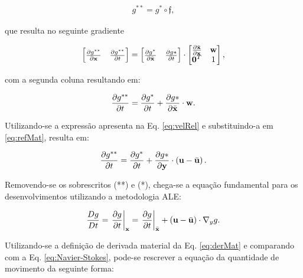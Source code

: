 \documentclass[tese_patricia]{subfiles}%
\begin{document}
\begin{align}
	g^{**} = g^{*}  \circ \mathfrak{f},
\end{align}

\noindent que resulta no seguinte gradiente

\begin{align}
	\begin{bmatrix}
		\frac{\partial {g^{**}}}{\partial {\mathbf{x}}} & \frac{\partial {g^{**}}}{\partial t} \\
	\end{bmatrix}
	=
	\begin{bmatrix}
		\frac{\partial {g^*}}{\partial \bar{\mathbf{x}}} & \frac{\partial {g*}}{\partial t} 
	\end{bmatrix}
	\cdot
	\begin{bmatrix}
		\frac{\partial {\bar{\mathbf{x}}}}{\partial {\mathbf{x}}} & \mathbf{w} \\
		\mathbf{0}^T & 1 \\
	\end{bmatrix},
\end{align}


\noindent com a segunda coluna resultando em:

\begin{align}
	\frac{\partial g^{**}}{\partial t} = \frac{\partial g^*}{\partial t} + \frac{\partial g*}{\partial \bar{\mathbf{x}}} \cdot \mathbf{w}. \label{eq:refMat}
\end{align}

Utilizando-se a expressão apresenta na Eq. \ref{eq:velRel} e substituindo-a em \ref{eq:refMat}, resulta em:

\begin{align}
	\frac{\partial g^{**}}{\partial t} = \frac{\partial g^*}{\partial t} + \frac{\partial g*}{\partial \mathbf{y}} \cdot \left(\mathbf{u} - \bar{\mathbf{u}} \right). 
\end{align}

Removendo-se os sobrescritos (**) e (*), chega-se a equação fundamental para os desenvolvimentos utilizando a metodologia ALE:

\begin{align}
	\frac{Dg}{Dt} = \left . \frac{\partial g}{\partial t} \right|_{\mathbf{x}} = \left . \frac{\partial g}{\partial t} \right|_{\bar{\mathbf{x}}} + \left(\mathbf{u} - \bar{\mathbf{u}} \right) \cdot \nabla_y g. \label{eq:DerMatALE}
\end{align}

Utilizando-se a definição de derivada material da Eq. \ref{eq:derMat} e comparando com a Eq. \ref{eq:Navier-Stokes}, pode-se rescrever a equação da quantidade de movimento da seguinte forma:
\end{document}
